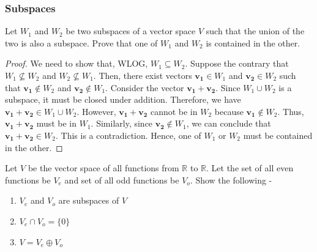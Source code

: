 \documentclass[openany]{book}
\begin{document}
\subsubsection{Subspaces}
\begin{exercise}
    Let $W_1$ and $W_2$ be two subspaces of a vector space $V$ such that the union of the two is also a subspace. Prove that one of $W_1$ and $W_2$ is contained in the other. 
\end{exercise}
\begin{proof}
We need to show that, WLOG, $W_1 \subseteq W_2$.
Suppose the contrary that $W_1 \nsubseteq W_2$ and $W_2 \nsubseteq W_1$. Then, there exist vectors $\mathbf{v_1} \in W_1$ and $\mathbf{v_2} \in W_2$ such that $\mathbf{v_1} \notin W_2$ and $\mathbf{v_2} \notin W_1$.
Consider the vector $\mathbf{v_1} + \mathbf{v_2}$. Since $W_1 \cup W_2$ is a subspace, it must be closed under addition. Therefore, we have $\mathbf{v_1} + \mathbf{v_2} \in W_1 \cup W_2$.
However, $\mathbf{v_1} + \mathbf{v_2}$ cannot be in $W_2$ because $\mathbf{v_1} \notin W_2$. Thus, $\mathbf{v_1} + \mathbf{v_2}$ must be in $W_1$. Similarly, since $\mathbf{v_2} \notin W_1$, we can conclude that $\mathbf{v_1} + \mathbf{v_2} \in W_2$. This is a contradiction. Hence, one of $W_1$ or $W_2$ must be contained in the other.
\end{proof}
\begin{exercise}
    Let $V$ be the vector space of all functions from $\mathbb{R}$ to $\mathbb{R}$. Let the set of all even functions be $V_e$ and set of all odd functions be $V_o$. Show the following - 
    \begin{enumerate}
        \item $V_e$ and $V_o$ are subspaces of $V$
        \item $V_e \cap V_o = \{0\}$
        \item $V = V_e \oplus V_o$
    \end{enumerate}
\end{exercise}
\end{document}
